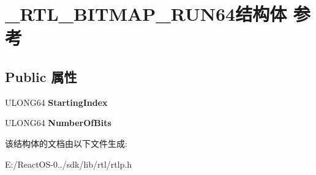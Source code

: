 \hypertarget{struct___r_t_l___b_i_t_m_a_p___r_u_n64}{}\section{\+\_\+\+R\+T\+L\+\_\+\+B\+I\+T\+M\+A\+P\+\_\+\+R\+U\+N64结构体 参考}
\label{struct___r_t_l___b_i_t_m_a_p___r_u_n64}
\subsection*{Public 属性}
\begin{DoxyCompactItemize}
\item 
\mbox{\label{struct___r_t_l___b_i_t_m_a_p___r_u_n64_a2fe4745ce1abeba733dfb0e02b53b729}} 
U\+L\+O\+N\+G64 {\bfseries Starting\+Index}
\item 
\mbox{\label{struct___r_t_l___b_i_t_m_a_p___r_u_n64_ae235f487c247a5f5e5f2196b281352be}} 
U\+L\+O\+N\+G64 {\bfseries Number\+Of\+Bits}
\end{DoxyCompactItemize}


该结构体的文档由以下文件生成\+:\begin{DoxyCompactItemize}
\item 
E\+:/\+React\+O\+S-\/0../sdk/lib/rtl/rtlp.\+h\end{DoxyCompactItemize}
